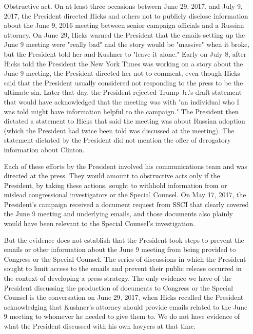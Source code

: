 Obstructive act.
On at least three occasions between June 29, 2017, and July 9, 2017, the President directed Hicks and others not to publicly disclose information about the June 9, 2016 meeting between senior campaign officials and a Russian attorney.
On June 29, Hicks warned the President that the emails setting up the June 9 meeting were "really bad" and the story would be "massive" when it broke, but the President told her and Kushner to "leave it alone."
Early on July 8, after Hicks told the President the New York Times was working on a story about the June 9 meeting, the President directed her not to comment, even though Hicks said that the President usually considered not responding to the press to be the ultimate sin.
Later that day, the President rejected Trump Jr.'s draft statement that would have acknowledged that the meeting was with "an individual who I was told might have information helpful to the campaign." The President then dictated a statement to Hicks that said the meeting was about Russian adoption (which the President had twice been told was discussed at the meeting).
The statement dictated by the President did not mention the offer of derogatory information about Clinton.

Each of these efforts by the President involved his communications team and was directed at the press.
They would amount to obstructive acts only if the President, by taking these actions, sought to withhold information from or mislead congressional investigators or the Special Counsel.
On May 17, 2017, the President's campaign received a document request from SSCI that clearly covered the June 9 meeting and underlying emails, and those documents also plainly would have been relevant to the Special Counsel's investigation.

But the evidence does not establish that the President took steps to prevent the emails or other information about the June 9 meeting from being provided to Congress or the Special Counsel.
The series of discussions in which the President sought to limit access to the emails and prevent their public release occurred in the context of developing a press strategy.
The only evidence we have of the President discussing the production of documents to Congress or the Special Counsel is the conversation on June 29, 2017, when Hicks recalled the President acknowledging that Kushner's attorney should provide emails related to the June 9 meeting to whomever he needed to give them to.
We do not have evidence of what the President discussed with his own lawyers at that time.

